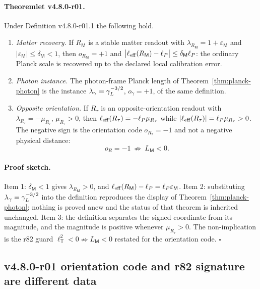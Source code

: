 \paragraph{Theoremlet v4.8.0-r01.}
Under Definition v4.8.0-r01.1 the following hold.
\begin{enumerate}[leftmargin=2em]
 \item \emph{Matter recovery.}  If \(R_{\mathsf M}\) is a stable matter readout with
 \(\lambda_{R_{\mathsf M}}=1+\varepsilon_{\mathsf M}\) and
 \(|\varepsilon_{\mathsf M}|\le\delta_{\mathsf M}<1\), then
 \(o_{R_{\mathsf M}}=+1\) and
 \(\bigl|\ell_{\rm eff}(R_{\mathsf M})-\ell_P\bigr|\le\delta_{\mathsf M}\ell_P\): the ordinary Planck
 scale is recovered up to the declared local calibration error.
 \item \emph{Photon instance.}  The photon-frame Planck length of
 Theorem~\ref{thm:planck-photon} is the instance
 \(\lambda_{\gamma}=\gamma_L^{-3/2}\), \(o_\gamma=+1\), of the same definition.
 \item \emph{Opposite orientation.}  If \(R_\tau\) is an opposite-orientation readout with
 \(\lambda_{R_\tau}=-\mu_{R_\tau}\), \(\mu_{R_\tau}>0\), then
 \(\ell_{\rm eff}(R_\tau)=-\ell_P\mu_{R_\tau}\) while
 \(|\ell_{\rm eff}(R_\tau)|=\ell_P\mu_{R_\tau}>0\).  The negative sign is the orientation code
 \(o_{R_\tau}=-1\) and not a negative physical distance:
 \[
 o_{R}=-1\ \not\Rightarrow\ L_{\mathsf M}<0 .
 \]
\end{enumerate}

\paragraph{Proof sketch.}
Item 1: \(\delta_{\mathsf M}<1\) gives \(\lambda_{R_{\mathsf M}}>0\), and
\(\ell_{\rm eff}(R_{\mathsf M})-\ell_P=\ell_P\varepsilon_{\mathsf M}\).  Item 2: substituting
\(\lambda_\gamma=\gamma_L^{-3/2}\) into the definition reproduces the display of
Theorem~\ref{thm:planck-photon}; nothing is proved anew and the status of that theorem is
inherited unchanged.  Item 3: the definition separates the signed coordinate from its
magnitude, and the magnitude is positive whenever \(\mu_{R_\tau}>0\).  The non-implication is
the r82 guard \(\ell_{\mathsf T}^2<0\not\Rightarrow L_{\mathsf M}<0\) restated for the
orientation code.  \(\square\)

\subsection*{v4.8.0-r01 orientation code and r82 signature are different data}
\label{subsec:v480-r01-orientation-vs-signature}

